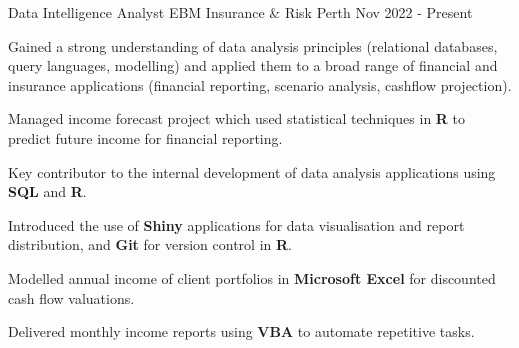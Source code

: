 

\begin{cventries}

  \cventry
    {Data Intelligence Analyst} %
    {EBM Insurance \& Risk} %
    {Perth} %
    {Nov 2022 - Present} %
    {
      \begin{cvitems} %
        \item {Gained a strong understanding of data analysis principles (relational databases, query languages, modelling) and applied them to a broad range of financial and insurance applications (financial reporting, scenario analysis, cashflow projection).}
        \item {Managed income forecast project which used statistical techniques in \textbf{R} to predict future income for financial reporting.}
        \item {Key contributor to the internal development of data analysis applications using \textbf{SQL} and \textbf{R}.}
        \item {Introduced the use of \textbf{Shiny} applications for data visualisation and report distribution, and \textbf{Git} for version control in \textbf{R}.}
        \item {Modelled annual income of client portfolios in \textbf{Microsoft Excel} for discounted cash flow valuations.}
        \item {Delivered monthly income reports using \textbf{VBA} to automate repetitive tasks.}
      \end{cvitems}
    }

\end{cventries}
